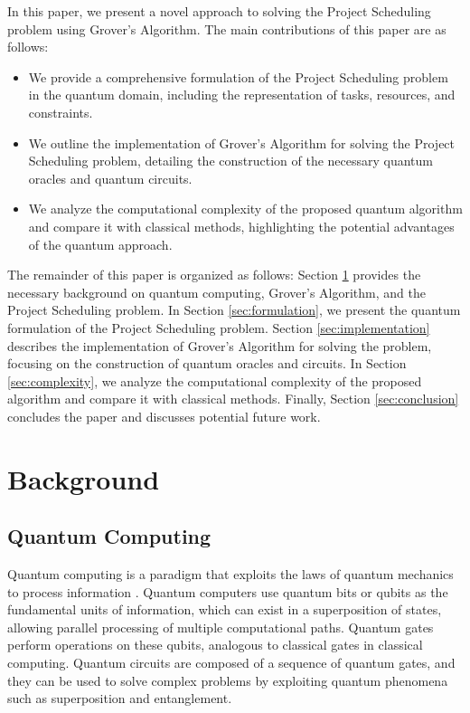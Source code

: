 In this paper, we present a novel approach to solving the Project Scheduling problem using Grover's Algorithm. The main contributions of this paper are as follows:
\begin{itemize}
    \item We provide a comprehensive formulation of the Project Scheduling problem in the quantum domain, including the representation of tasks, resources, and constraints.
    \item We outline the implementation of Grover's Algorithm for solving the Project Scheduling problem, detailing the construction of the necessary quantum oracles and quantum circuits.
    \item We analyze the computational complexity of the proposed quantum algorithm and compare it with classical methods, highlighting the potential advantages of the quantum approach.
\end{itemize}

The remainder of this paper is organized as follows: Section \ref{sec:background} provides the necessary background on quantum computing, Grover's Algorithm, and the Project Scheduling problem. In Section \ref{sec:formulation}, we present the quantum formulation of the Project Scheduling problem. Section \ref{sec:implementation} describes the implementation of Grover's Algorithm for solving the problem, focusing on the construction of quantum oracles and circuits. In Section \ref{sec:complexity}, we analyze the computational complexity of the proposed algorithm and compare it with classical methods. Finally, Section \ref{sec:conclusion} concludes the paper and discusses potential future work.

\section{Background}\label{sec:background}

\subsection{Quantum Computing}

Quantum computing is a paradigm that exploits the laws of quantum mechanics to process information \cite{nielsen2002quantum}. Quantum computers use quantum bits or qubits as the fundamental units of information, which can exist in a superposition of states, allowing parallel processing of multiple computational paths. Quantum gates perform operations on these qubits, analogous to classical gates in classical computing. Quantum circuits are composed of a sequence of quantum gates, and they can be used to solve complex problems by exploiting quantum phenomena such as superposition and entanglement.

